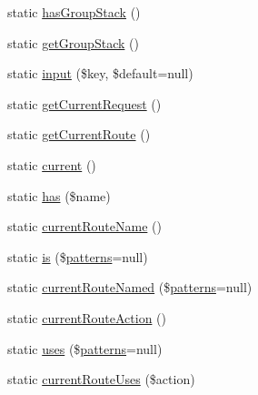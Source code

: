 \begin{DoxyCompactItemize}
\item 
static \mbox{\hyperlink{class_illuminate_1_1_support_1_1_facades_1_1_route_a79a54acb58c2839bd713b9837fb7df4a}{has\+Group\+Stack}} ()
\item 
static \mbox{\hyperlink{class_illuminate_1_1_support_1_1_facades_1_1_route_a82530084fbf4f15035b837ad7f76c885}{get\+Group\+Stack}} ()
\item 
static \mbox{\hyperlink{class_illuminate_1_1_support_1_1_facades_1_1_route_ab0ac1edc61bd2c5428d0470857d257b5}{input}} (\$key, \$default=null)
\item 
static \mbox{\hyperlink{class_illuminate_1_1_support_1_1_facades_1_1_route_a2d374f929804e9019f0edbff3b6114b0}{get\+Current\+Request}} ()
\item 
static \mbox{\hyperlink{class_illuminate_1_1_support_1_1_facades_1_1_route_a45a22de35b188f7aecb60ea655a6b4ae}{get\+Current\+Route}} ()
\item 
static \mbox{\hyperlink{class_illuminate_1_1_support_1_1_facades_1_1_route_aeec1a8e61c2cc8b2c74a809b696f068d}{current}} ()
\item 
static \mbox{\hyperlink{class_illuminate_1_1_support_1_1_facades_1_1_route_ab8e83d61a5fa5f28ca782e540d4cb65b}{has}} (\$name)
\item 
static \mbox{\hyperlink{class_illuminate_1_1_support_1_1_facades_1_1_route_aa51df157f19235dfa43fe5411466c559}{current\+Route\+Name}} ()
\item 
static \mbox{\hyperlink{class_illuminate_1_1_support_1_1_facades_1_1_route_a9b5244a7e5f3c63d5793da62a58ba646}{is}} (\$\mbox{\hyperlink{class_illuminate_1_1_support_1_1_facades_1_1_route_a5ffa318d86f489c77ed7e2ce757e0cd3}{patterns}}=null)
\item 
static \mbox{\hyperlink{class_illuminate_1_1_support_1_1_facades_1_1_route_a6a94528e537e7c79630ee8093c46ef28}{current\+Route\+Named}} (\$\mbox{\hyperlink{class_illuminate_1_1_support_1_1_facades_1_1_route_a5ffa318d86f489c77ed7e2ce757e0cd3}{patterns}}=null)
\item 
static \mbox{\hyperlink{class_illuminate_1_1_support_1_1_facades_1_1_route_a6ccd7018141278ca72001186a2c60444}{current\+Route\+Action}} ()
\item 
static \mbox{\hyperlink{class_illuminate_1_1_support_1_1_facades_1_1_route_adfbb616bc0fb81bd33b68ea7080444fb}{uses}} (\$\mbox{\hyperlink{class_illuminate_1_1_support_1_1_facades_1_1_route_a5ffa318d86f489c77ed7e2ce757e0cd3}{patterns}}=null)
\item 
static \mbox{\hyperlink{class_illuminate_1_1_support_1_1_facades_1_1_route_add49710873dc072055a44e6e78a20eb7}{current\+Route\+Uses}} (\$action)

\end{DoxyCompactItemize}
